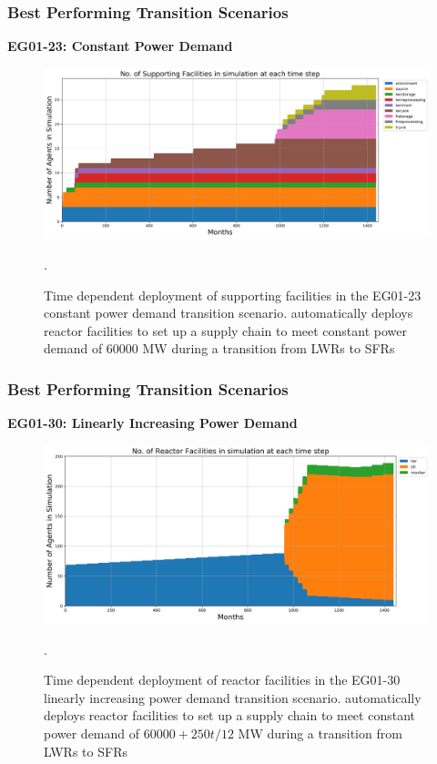 \begin{frame}
\frametitle{Best Performing Transition Scenarios}
\textbf{EG01-23: Constant Power Demand}
\begin{figure}[htbp!]
\begin{center}
\includegraphics[width=\textwidth]{images/eg23-stack_support.png}
\end{center}
\caption{Time dependent deployment of supporting facilities in 
the EG01-23 constant power demand transition scenario. 
\deploy automatically deploys reactor facilities 
to set up a supply chain to meet constant power demand of $60000$ MW
during a transition from \glspl{LWR} to \glspl{SFR}}.
\end{figure}
\end{frame}

\begin{frame}
\frametitle{Best Performing Transition Scenarios}
\textbf{EG01-30: Linearly Increasing Power Demand}
\begin{figure}[htbp!]
\begin{center}
\includegraphics[width=\textwidth]{images/eg30-stack_reactor.png}
\end{center}
\caption{Time dependent deployment of reactor facilities in 
the EG01-30 linearly increasing power demand transition scenario. 
\deploy automatically deploys reactor facilities 
to set up a supply chain to meet constant power demand of $60000+250t/12$ MW
during a transition from \glspl{LWR} to \glspl{SFR}}.
\end{figure}
\end{frame}

